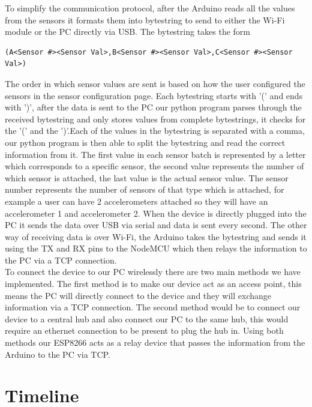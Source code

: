 \documentclass[12pt, titlepage]{article}
\begin{document}
To simplify the communication protocol, after the Arduino reads all the values from the sensors it formats them into bytestring to send to either the Wi-Fi module or the PC directly via USB. The bytestring takes the form

\begin{verbatim}
(A<Sensor #><Sensor Val>,B<Sensor #><Sensor Val>,C<Sensor #><Sensor Val>)
\end{verbatim}

The order in which sensor values are sent is based on how the user configured the sensors in the sensor configuration page. Each bytestring starts with '(' and ends with ')', after the data is sent to the PC our python program parses through the received bytestring and only stores values from complete bytestrings, it checks for the '(' and the ')'.Each of the values in the bytestring is separated with a comma, our python program is then able to split the bytestring and read the correct information from it. The first value in each sensor batch is represented by a letter which corresponds to a specific sensor, the second value represents the number of which sensor is attached, the last value is the actual sensor value. The sensor number represents the number of sensors of that type which is attached, for example a user can have 2 accelerometers attached so they will have an accelerometer 1 and accelerometer 2. When the device is directly plugged into the PC it sends the data over USB via serial and data is sent every second. The other way of receiving data is over Wi-Fi, the Arduino takes the bytestring and sends it using the TX and RX pins to the NodeMCU which then relays the information to the PC via a TCP connection.\\

To connect the device to our PC wirelessly there are two main methods we have implemented. The first method is to make our device act as an access point, this means the PC will directly connect to the device and they will exchange information via a TCP connection. The second method would be to connect our device to a central hub and also connect our PC to the same hub, this would require an ethernet connection to be present to plug the hub in. Using both methods our ESP8266 acts as a relay device that passes the information from the Arduino to the PC via TCP.


\newpage
\section{Timeline}
\end{document}
